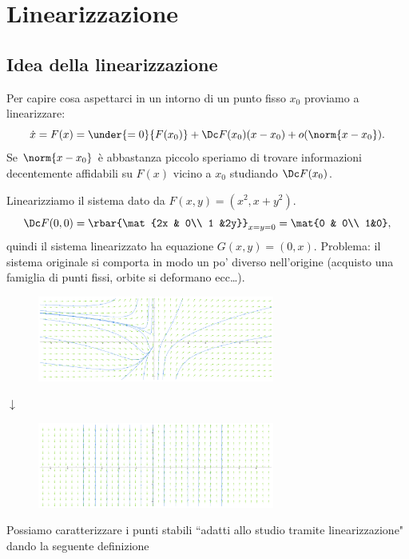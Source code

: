 \chapter{Linearizzazione}
\section{Idea della linearizzazione}
Per capire cosa aspettarci in un intorno di un punto fisso $x_0$ proviamo a linearizzare:
\[\dot x=F(x)=\under{=0}{F(x_0)}+\Dc F(x_0)(x-x_0)+o(\norm{x-x_0}).\]
Se $\norm{x-x_0}$ \`e abbastanza piccolo speriamo di trovare informazioni decentemente affidabili su $F(x)$ vicino a $x_0$ studiando $\Dc F(x_0)$.
\begin{example}
Linearizziamo il sistema dato da $F(x,y)=(x^2,x+y^2)$.
\[\Dc F(0,0)=\rbar{\mat{2x & 0\\ 1 &2y}}_{x=y=0}=\mat{0 & 0\\ 1&0},\]
quindi il sistema linearizzato ha equazione $G(x,y)=(0,x)$.
Problema: il sistema originale si comporta in modo un po' diverso nell'origine (acquisto una famiglia di punti fissi, orbite si deformano ecc\dots).
\begin{center}
    \begin{figure}[!htb]
        \centering
        \includegraphics[height=2.8cm]{Immagini/fallita_linearizzazione.pdf}
    \end{figure}
    $\downarrow$
    \begin{figure}[!htb]
        \centering
        \includegraphics[height=2.8cm]{Immagini/fallita_linearizzazione_linearizzato.pdf}
    \end{figure}
\end{center}



\end{example}

\noindent Possiamo caratterizzare i punti stabili ``adatti allo studio tramite linearizzazione" dando la seguente definizione

